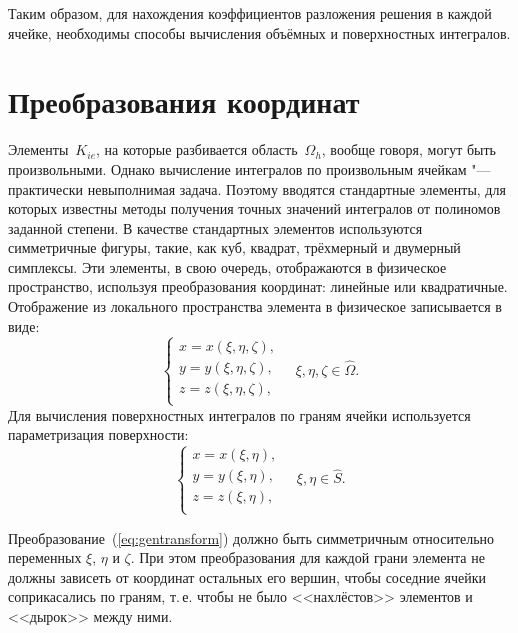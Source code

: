 Таким образом, для нахождения коэффициентов разложения решения в каждой ячейке, необходимы способы вычисления объёмных и поверхностных интегралов.



\section{Преобразования координат} \label{sect:transform}

Элементы~\(K_{ie}\), на которые разбивается область~\(\Omega_h\), вообще говоря, могут быть произвольными. Однако вычисление интегралов по произвольным ячейкам "--- практически невыполнимая задача. Поэтому вводятся стандартные элементы, для которых известны методы получения точных значений интегралов от полиномов заданной степени. В качестве стандартных элементов используются симметричные фигуры, такие, как куб, квадрат, трёхмерный и двумерный симплексы. Эти элементы, в свою очередь, отображаются в физическое пространство, используя преобразования координат: линейные или квадратичные. Отображение из локального пространства элемента в физическое записывается в виде:
\begin{equation}\label{eq:gentransform}
\left\{\begin{array}{l}
x = x (\xi, \eta, \zeta), \\
y = y (\xi, \eta, \zeta), \\
z = z (\xi, \eta, \zeta), \\
\end{array}\right.\quad \xi, \eta, \zeta \in \hat \Omega.
\end{equation}
Для вычисления поверхностных интегралов по граням ячейки используется параметризация поверхности:
\begin{equation}\label{eq:genparam}
\left\{\begin{array}{l}
x = x (\xi, \eta), \\
y = y (\xi, \eta), \\
z = z (\xi, \eta), \\
\end{array}\right.\quad \xi, \eta \in \hat S.
\end{equation}

Преобразование~(\ref{eq:gentransform}) должно быть симметричным относительно переменных \(\xi\), \(\eta\) и \(\zeta\). При этом преобразования для каждой грани элемента не должны зависеть от координат остальных его вершин, чтобы соседние ячейки соприкасались по граням, т.\,е. чтобы не было <<нахлёстов>> элементов и <<дырок>> между ними.

